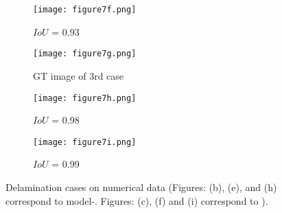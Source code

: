 \begin{figure} [!h]
\begin{subfigure}[b]{0.32\textwidth}
		\label{fig:Convlstm_num_462}
	\end{subfigure}
	\hfill
	\begin{subfigure}[b]{0.32\textwidth}
		\centering
		\DIFdelbeginFL %
\DIFdelendFL \DIFaddbeginFL \texttt{[image: figure7f.png]}
		\DIFaddendFL \caption{\(IoU\) \DIFdelbeginFL {}\DIFdelendFL = 0.93}
		\label{fig:AE_num_462}
	\end{subfigure}
	\par\medskip
	\begin{subfigure}[b]{0.32\textwidth}
		\centering
		\DIFdelbeginFL %
\DIFdelendFL \DIFaddbeginFL \texttt{[image: figure7g.png]}
		\DIFaddendFL \caption{GT image of 3rd case}
		\label{fig:num_GT_453}
	\end{subfigure}
	\hfill	
	\begin{subfigure}[b]{0.32\textwidth}
		\centering
		\DIFdelbeginFL %
\DIFdelendFL \DIFaddbeginFL \texttt{[image: figure7h.png]}
		\DIFaddendFL \caption{\(IoU\) \DIFdelbeginFL {}\DIFdelendFL = 0.98 }
		\label{fig:Convlstm_num_453}
	\end{subfigure}
	\hfill	
	\begin{subfigure}[b]{0.32\textwidth}
		\centering
		\DIFdelbeginFL %
\DIFdelendFL \DIFaddbeginFL \texttt{[image: figure7i.png]}
		\DIFaddendFL \caption{\(IoU\) \DIFdelbeginFL {}\DIFdelendFL = 0.99}
		\label{fig:AE_num_453}
	\end{subfigure}
	\caption{Delamination cases on numerical data (Figures: (b), (e), and (h) correspond to model-. 
		Figures: (c), (f) and (i) correspond to \DIFdelbeginFL {}\DIFdelendFL \DIFaddbeginFL {}\DIFaddendFL {}).}
	\label{fig:num_case}
\end{figure} 
\clearpage
